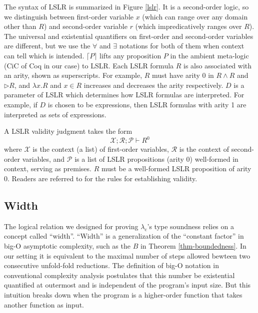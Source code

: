 \documentclass[preprint]{sigplanconf}
\newcommand{\later}{\triangleright}
\newcommand{\logo}{\lambda_\mathrm{c}}
\begin{document}
The syntax of LSLR is summarized in Figure \ref{lslr}. It is a second-order logic, so we distinguish between first-order variable $x$ (which can range over any domain other than $R$) and second-order variable $r$ (which impredicatively ranges over $R$). The universal and existential quantifiers on first-order and second-order variables are different, but we use the $\forall$ and $\exists$ notations for both of them when context can tell which is intended. $\lceil P \rceil$ lifts any proposition $P$ in the ambient meta-logic (CiC of Coq in our case) to LSLR. Each LSLR formula $R$ is also associated with an arity, shown as superscripts. For example, $R$ must have arity 0 in $R \wedge R$ and $\later R$, and $\lambda x.R$ and $x\in R$ increases and decreases the arity respectively. $D$ is a parameter of LSLR which determines how LSLR formulas are interpreted. For example, if $D$ is chosen to be expressions, then LSLR formulas with arity 1 are interpreted as sets of expressions. 

A LSLR validity judgment takes the form
$$\mathcal{X};\mathcal{R};\mathcal{P}\vdash R^0$$
where $\mathcal{X}$ is the context (a list) of first-order variables, $\mathcal{R}$ is the context of second-order variables, and $\mathcal{P}$ is a list of LSLR propositions (arity 0) well-formed in context, serving as premises. $R$ must be a well-formed LSLR proposition of arity 0. Readers are referred to \cite{dreyer2009logical} for the rules for establishing validity.

\subsection {Width}

The logical relation we designed for proving $\logo$'s type soundness relies on a concept called ``width''. ``Width'' is a generalization of the ``constant factor'' in big-O asymptotic complexity, such as the $B$ in Theorem \ref{thm-boundedness}. In our setting it is equivalent to the maximal number of steps allowed bewteen two consecutive unfold-fold reductions. The definition of big-O notation in conventional complexity analysis postulates that this number be existential quantified at outermost and is independent of the program's input size. But this intuition breaks down when the program is a higher-order function that takes another function as input. 
\end{document}
